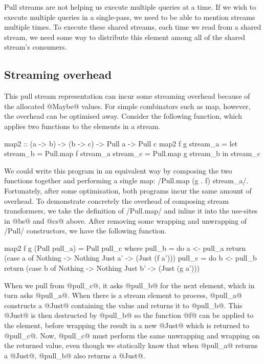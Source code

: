 Pull streams are not helping us execute multiple queries at a time.
If we wish to execute multiple queries in a single-pass, we need to be able to mention streams multiple times.
To execute these shared streams, each time we read from a shared stream, we need some way to distribute this element among all of the shared stream's consumers.

\subsection{Streaming overhead}
\label{taxonomy/pull/streaming-overhead}

This pull stream representation can incur some streaming overhead because of the allocated @Maybe@ values.
For simple combinators such as map, however, the overhead can be optimised away.
Consider the following function, which applies two functions to the elements in a stream.

\begin{haskell}
map2 :: (a -> b) -> (b -> c) -> Pull a -> Pull c
map2 f g stream_a
 = let stream_b = Pull.map f stream_a
       stream_c = Pull.map g stream_b
   in  stream_c
\end{haskell}

We could write this program in an equivalent way by composing the two functions together and performing a single map: \Hs/Pull.map (g . f) stream_a/.
Fortunately, after some optimisation, both programs incur the same amount of overhead.
To demonstrate concretely the overhead of composing stream transformers, we take the definition of \Hs/Pull.map/ and inline it into the use-sites in @bs@ and @cs@ above.
After removing some wrapping and unwrapping of \Hs/Pull/ constructors, we have the following function.

\begin{haskell}
map2 f g (Pull pull_a) = Pull pull_c
 where
  pull_b = do
    a <- pull_a
    return (case a of
             Nothing -> Nothing
             Just a' -> (Just (f a')))
  pull_c = do
    b <- pull_b
    return (case b of
             Nothing -> Nothing
             Just b' -> (Just (g a')))
\end{haskell}

When we pull from @pull_c@, it asks @pull_b@ for the next element, which in turn asks @pull_a@.
When there is a stream element to process, @pull_a@ constructs a @Just@ containing the value and returns it to @pull_b@.
This @Just@ is then destructed by @pull_b@ so the function @f@ can be applied to the element, before wrapping the result in a new @Just@ which is returned to @pull_c@.
Now, @pull_c@ must perform the same unwrapping and wrapping on the returned value, even though we statically know that when @pull_a@ returns a @Just@, @pull_b@ also returns a @Just@.

